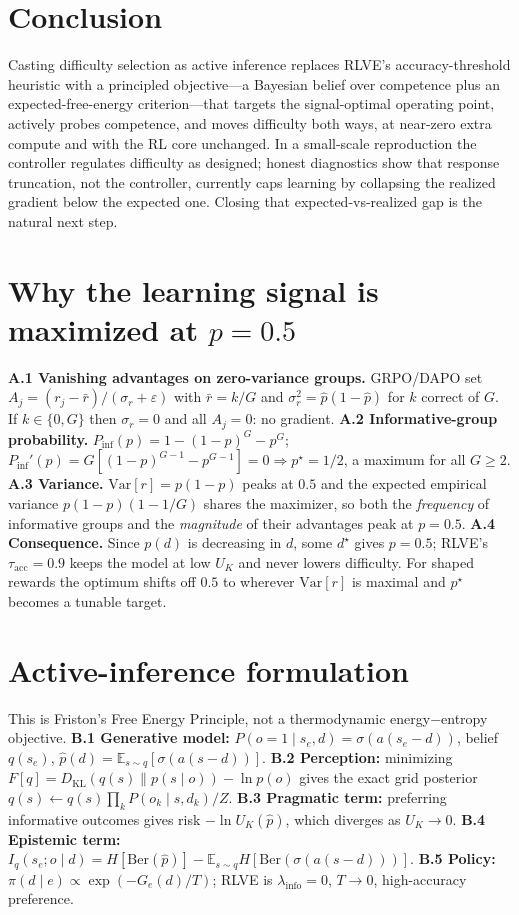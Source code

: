 \documentclass{article}
\newcommand{\UK}{U_{K}}
\newcommand{\KL}{D_{\mathrm{KL}}}
\begin{document}
\section{Conclusion}
Casting difficulty selection as active inference replaces RLVE's accuracy-threshold
heuristic with a principled objective---a Bayesian belief over competence plus an
expected-free-energy criterion---that targets the signal-optimal operating point,
actively probes competence, and moves difficulty both ways, at near-zero extra
compute and with the RL core unchanged. In a small-scale reproduction the
controller regulates difficulty as designed; honest diagnostics show that
response truncation, not the controller, currently caps learning by collapsing the
realized gradient below the expected one. Closing that expected-vs-realized gap is
the natural next step.




\appendix
\section{Why the learning signal is maximized at \texorpdfstring{$p=0.5$}{p=0.5}}
\textbf{A.1 Vanishing advantages on zero-variance groups.} GRPO/DAPO set
$A_j=(r_j-\bar r)/(\sigma_r+\varepsilon)$ with $\bar r=k/G$ and
$\sigma_r^2=\hat p(1-\hat p)$ for $k$ correct of $G$. If $k\in\{0,G\}$ then
$\sigma_r=0$ and all $A_j=0$: no gradient. \textbf{A.2 Informative-group
probability.} $P_{\mathrm{inf}}(p)=1-(1-p)^G-p^G$; $P_{\mathrm{inf}}'(p)=G[(1-p)^{G-1}-p^{G-1}]=0\Rightarrow p^\star=1/2$,
a maximum for all $G\ge2$. \textbf{A.3 Variance.} $\mathrm{Var}[r]=p(1-p)$ peaks at
$0.5$ and the expected empirical variance $p(1-p)(1-1/G)$ shares the maximizer, so
both the \emph{frequency} of informative groups and the \emph{magnitude} of their
advantages peak at $p=0.5$. \textbf{A.4 Consequence.} Since $p(d)$ is decreasing
in $d$, some $d^\star$ gives $p=0.5$; RLVE's $\tau_{\mathrm{acc}}{=}0.9$ keeps the
model at low $\UK$ and never lowers difficulty. For shaped rewards the optimum
shifts off $0.5$ to wherever $\mathrm{Var}[r]$ is maximal and $p^\star$ becomes a
tunable target.

\section{Active-inference formulation}
This is Friston's Free Energy Principle, not a thermodynamic energy$-$entropy
objective. \textbf{B.1 Generative model:} $P(o{=}1\mid s_e,d)=\sigma(a(s_e-d))$,
belief $q(s_e)$, $\hat p(d)=\mathbb{E}_{s\sim q}[\sigma(a(s-d))]$. \textbf{B.2
Perception:} minimizing $F[q]=\KL(q(s)\|p(s\mid o))-\ln p(o)$ gives the exact grid
posterior $q(s)\leftarrow q(s)\prod_k P(o_k\mid s,d_k)/Z$. \textbf{B.3 Pragmatic
term:} preferring informative outcomes gives risk $-\ln \UK(\hat p)$, which
diverges as $\UK\!\to\!0$. \textbf{B.4 Epistemic term:}
$I_q(s_e;o\mid d)=H[\mathrm{Ber}(\hat p)]-\mathbb{E}_{s\sim q}H[\mathrm{Ber}(\sigma(a(s-d)))]$.
\textbf{B.5 Policy:} $\pi(d\mid e)\propto\exp(-G_e(d)/T)$; RLVE is
$\lambda_{\mathrm{info}}{=}0$, $T\!\to\!0$, high-accuracy preference.
\end{document}
